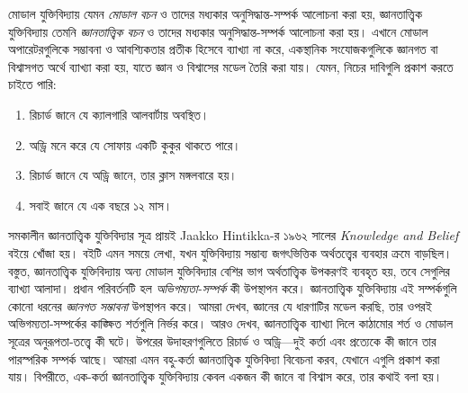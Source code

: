 \documentclass[../../../include/open-logic-section]{subfiles}
\begin{document}


মোডাল যুক্তিবিদ্যায় যেমন \emph{মোডাল বচন} ও তাদের মধ্যকার অনুসিদ্ধান্ত-সম্পর্ক আলোচনা করা হয়, জ্ঞানতাত্ত্বিক যুক্তিবিদ্যায় তেমনি \emph{জ্ঞানতাত্ত্বিক বচন} ও তাদের মধ্যকার অনুসিদ্ধান্ত-সম্পর্ক আলোচনা করা হয়। এখানে মোডাল অপারেটরগুলিকে সম্ভাবনা ও আবশ্যিকতার প্রতীক হিসেবে ব্যাখ্যা না করে, একস্থানিক সংযোজকগুলিকে জ্ঞানগত বা বিশ্বাসগত অর্থে ব্যাখ্যা করা হয়, যাতে জ্ঞান ও বিশ্বাসের মডেল তৈরি করা যায়। যেমন, নিচের দাবিগুলি প্রকাশ করতে চাইতে পারি:

\begin{enumerate}
\item রিচার্ড জানে যে ক্যালগারি আলবার্টায় অবস্থিত।
\item অড্রি মনে করে যে সোফায় একটি কুকুর থাকতে পারে।
\item রিচার্ড জানে যে অড্রি জানে, তার ক্লাস মঙ্গলবারে হয়।
\item সবাই জানে যে এক বছরে ১২ মাস।
\end{enumerate}
সমকালীন জ্ঞানতাত্ত্বিক যুক্তিবিদ্যার সূত্র প্রায়ই Jaakko Hintikka-র ১৯৬২ সালের \emph{Knowledge and Belief} বইয়ে খোঁজা হয়। বইটি এমন সময়ে লেখা, যখন যুক্তিবিদ্যায় সম্ভাব্য জগৎভিত্তিক অর্থতত্ত্বের ব্যবহার ক্রমে বাড়ছিল। বস্তুত, জ্ঞানতাত্ত্বিক যুক্তিবিদ্যায় অন্য মোডাল যুক্তিবিদ্যার বেশির ভাগ অর্থতাত্ত্বিক উপকরণই ব্যবহৃত হয়, তবে সেগুলির ব্যাখ্যা আলাদা। প্রধান পরিবর্তনটি হল \emph{অভিগম্যতা-সম্পর্ক} কী উপস্থাপন করে। জ্ঞানতাত্ত্বিক যুক্তিবিদ্যায় এই সম্পর্কগুলি কোনো ধরনের \emph{জ্ঞানগত সম্ভাবনা} উপস্থাপন করে। আমরা দেখব, জ্ঞানের যে ধারণাটির মডেল করছি, তার ওপরই অভিগম্যতা-সম্পর্কের কাঙ্ক্ষিত শর্তগুলি নির্ভর করে। আরও দেখব, জ্ঞানতাত্ত্বিক ব্যাখ্যা দিলে কাঠামোর শর্ত ও মোডাল সূত্রের অনুরূপতা-তত্ত্বে কী ঘটে। উপরের উদাহরণগুলিতে রিচার্ড ও অড্রি—দুই কর্তা এবং প্রত্যেকে কী জানে তার পারস্পরিক সম্পর্ক আছে। আমরা এমন বহু-কর্তা জ্ঞানতাত্ত্বিক যুক্তিবিদ্যা বিবেচনা করব, যেখানে এগুলি প্রকাশ করা যায়। বিপরীতে, এক-কর্তা জ্ঞানতাত্ত্বিক যুক্তিবিদ্যায় কেবল একজন কী জানে বা বিশ্বাস করে, তার কথাই বলা হয়।
\end{document}
